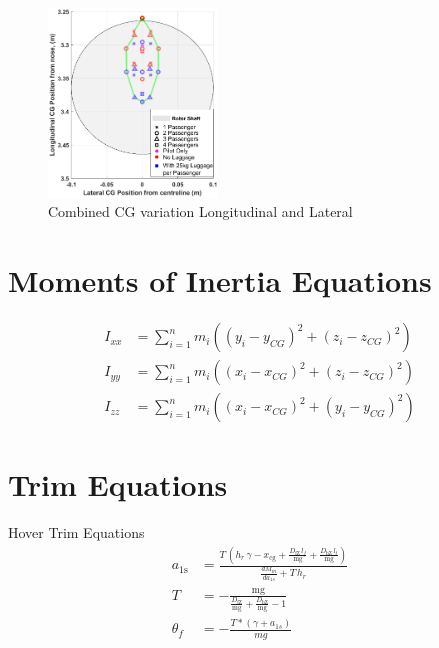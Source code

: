 \documentclass[11pt,a4paper]{article}
\begin{document}
\begin{appendices}
\begin{figure}[H]
    \centering
    \includegraphics[width=0.4\textwidth]{CGLATVLONG.eps}
    \caption{Combined CG variation Longitudinal and Lateral}
    \label{fig:cglongvlat}
\end{figure}{}
%
%
\section{Moments of Inertia Equations}
\renewcommand\thefigure{B.\arabic{figure}}  
\setcounter{figure}{0}
\renewcommand\theequation{B.\arabic{equation}}  
\setcounter{equation}{0}
\renewcommand\thetable{B.\arabic{table}}  
\setcounter{table}{0}
\begin{align}
I_{xx}&=\sum_{i=1}^{n} m_{i}\left(\left(y_{i}-y_{C G}\right)^{2}+\left(z_{i}-z_{C G}\right)^{2}\right)\label{eq:ixx}\\
   I_{yy}&=\sum_{i=1}^{n} m_{i}\left(\left(x_{i}-x_{C G}\right)^{2}+\left(z_{i}-z_{C G}\right)^{2}\right)\\
   I_{zz}&=\sum_{i=1}^{n} m_{i}\left(\left(x_{i}-x_{C G}\right)^{2}+\left(y_{i}-y_{C G}\right)^{2}\right) \label{eq:izz}
\end{align}{}

\thispagestyle{empty}
%
%
\section{Trim Equations}
\renewcommand\thefigure{C.\arabic{figure}}  
\setcounter{figure}{0}
\renewcommand\theequation{C.\arabic{equation}}  
\setcounter{equation}{0}
\renewcommand\thetable{C.\arabic{table}}  
\setcounter{table}{0}
\thispagestyle{empty}
Hover Trim Equations
\begin{align}
    a_{\mathrm{1s}}&=\frac{T\,\left(h_{r}\,\gamma-x_{\mathrm{cg}}+\frac{D_{\mathrm{fZ}}\,l_{f}}{\mathrm{mg}}+\frac{D_{\mathrm{hZ}}\,l_{t}}{\mathrm{mg}}\right)}{\frac{dM_m}{da_{1s}}+T\,h_{r}}\\
    T&=-\frac{\mathrm{mg}}{\frac{D_{\mathrm{fZ}}}{\mathrm{mg}}+\frac{D_{\mathrm{hZ}}}{\mathrm{mg}}-1}\\
    \theta_f&=-\frac{T*(\gamma + a_{1s})}{mg} \label{eq:trimeq}
\end{align}{}


\end{appendices}
\end{document}
